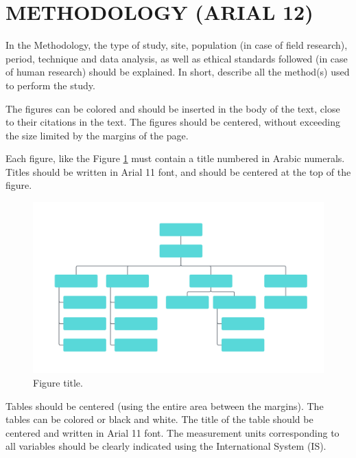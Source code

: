 \documentclass[
	article,			%
	12pt,				%
	oneside,			%
	a4paper,			%
	english,			%
	brazil,				%
	sumario=tradicional
	]{abntex2}
\begin{document}
\section{\textbf{METHODOLOGY (ARIAL 12)}}

In the Methodology, the type of study, site, population (in case of field research), period, technique and data analysis, as well as ethical standards followed (in case of human research) should be explained. In short, describe all the method(s) used to perform the study.

The figures can be colored and should be inserted in the body of the text, close to their citations in the text. The figures should be centered, without exceeding the size limited by the margins of the page.

Each figure, like the Figure \ref{fig:figura-organograma} must contain a title numbered in Arabic numerals. Titles should be written in Arial 11 font, and should be centered at the top of the figure.


\begin{figure} [h!]	
   \label{fig:figura-organograma}											 
	\centering		
	\caption{Figure title.}
	\includegraphics[width=1\textwidth]{organograma.png}
\end{figure}



Tables should be centered (using the entire area between the margins). The tables can be colored or black and white. The title of the table should be centered and written in Arial 11 font. The measurement units corresponding to all variables should be clearly indicated using the International System (IS).
\end{document}
